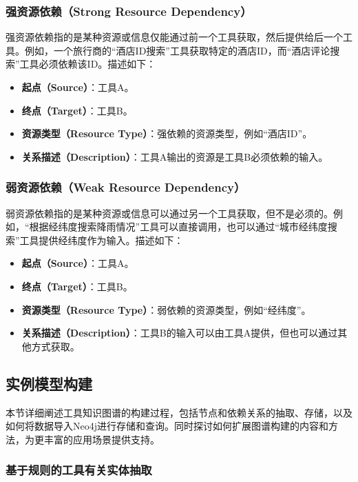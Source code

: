 \subsubsection{强资源依赖（Strong Resource Dependency）}
强资源依赖指的是某种资源或信息仅能通过前一个工具获取，然后提供给后一个工具。例如，一个旅行商的“酒店ID搜索”工具获取特定的酒店ID，而“酒店评论搜索”工具必须依赖该ID。描述如下：
\begin{itemize}
    \item \textbf{起点（Source）}：工具A。
    \item \textbf{终点（Target）}：工具B。
    \item \textbf{资源类型（Resource Type）}：强依赖的资源类型，例如``酒店ID''。
    \item \textbf{关系描述（Description）}：工具A输出的资源是工具B必须依赖的输入。
\end{itemize}

\subsubsection{弱资源依赖（Weak Resource Dependency）}
弱资源依赖指的是某种资源或信息可以通过另一个工具获取，但不是必须的。例如，“根据经纬度搜索降雨情况”工具可以直接调用，也可以通过“城市经纬度搜索”工具提供经纬度作为输入。描述如下：
\begin{itemize}
    \item \textbf{起点（Source）}：工具A。
    \item \textbf{终点（Target）}：工具B。
    \item \textbf{资源类型（Resource Type）}：弱依赖的资源类型，例如``经纬度''。
    \item \textbf{关系描述（Description）}：工具B的输入可以由工具A提供，但也可以通过其他方式获取。
\end{itemize}

\subsection{实例模型构建}

本节详细阐述工具知识图谱的构建过程，包括节点和依赖关系的抽取、存储，以及如何将数据导入Neo4j进行存储和查询。同时探讨如何扩展图谱构建的内容和方法，为更丰富的应用场景提供支持。

\subsubsection{基于规则的工具有关实体抽取}

